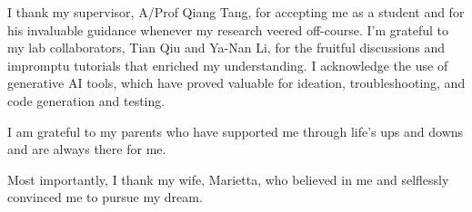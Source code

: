 I thank my supervisor, A/Prof Qiang Tang, for accepting me as a student and for his invaluable guidance whenever my research veered off-course. I'm grateful to my lab collaborators, Tian Qiu and Ya-Nan Li, for the fruitful discussions and impromptu tutorials that enriched my understanding. I acknowledge the use of generative AI tools, which have proved valuable for ideation, troubleshooting, and code generation and testing.

I am grateful to my parents who have supported me through life's ups and downs and are always there for me. 

Most importantly, I thank my wife, Marietta, who believed in me and selflessly convinced me to pursue my dream.